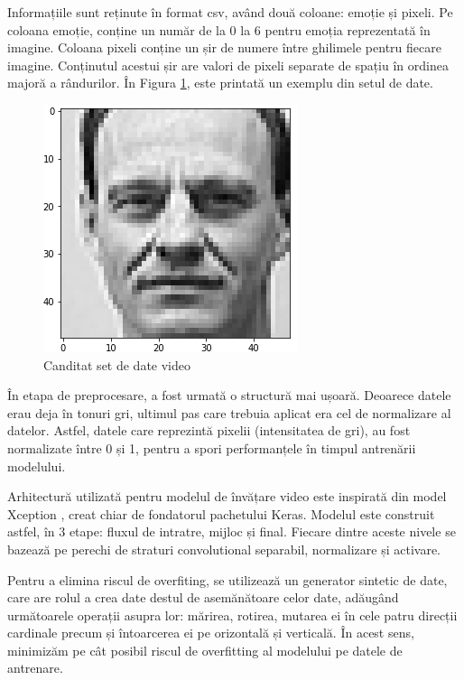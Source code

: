 \documentclass[a4paper, 12pt]{report}
\begin{document}
	Informațiile sunt reținute în format csv, având două coloane: emoție și pixeli. Pe coloana emoție, conține un număr de la 0 la 6 pentru emoția reprezentată în imagine. Coloana pixeli conține un șir de numere între ghilimele pentru fiecare imagine. Conținutul acestui șir are valori de pixeli separate de spațiu în ordinea majoră a rândurilor. În Figura \ref{fig:video_dataset_example}, este printată un exemplu din setul de date.
	
	\begin{figure}[H]
		\begin{center} 
			\includegraphics[scale=0.7]{images/video_dataset_example.png}
		\end{center}
		\caption{Canditat set de date video}
		\label{fig:video_dataset_example}
	\end{figure}
	
	În etapa de preprocesare, a fost urmată o structură mai ușoară. Deoarece datele erau deja în tonuri gri, ultimul pas care trebuia aplicat era cel de normalizare al datelor. Astfel, datele care reprezintă pixelii (intensitatea de gri), au fost normalizate între 0 și 1, pentru a spori performanțele în timpul antrenării modelului.
	
	Arhitectură utilizată pentru modelul de învățare video este inspirată din model Xception \cite{xception}, creat chiar de fondatorul pachetului Keras. Modelul este construit astfel, în 3 etape: fluxul de intratre, mijloc și final. Fiecare dintre aceste nivele se bazează pe perechi de straturi convolutional separabil, normalizare și activare. 
	
	Pentru a elimina riscul de overfiting, se utilizează un generator sintetic de date, care are rolul a crea date destul de asemănătoare celor date, adăugând următoarele operații asupra lor: mărirea, rotirea, mutarea ei în cele patru direcții cardinale precum și întoarcerea ei pe orizontală și verticală. În acest sens, minimizăm pe cât posibil riscul de overfitting al modelului pe datele de antrenare.
	
\end{document}
